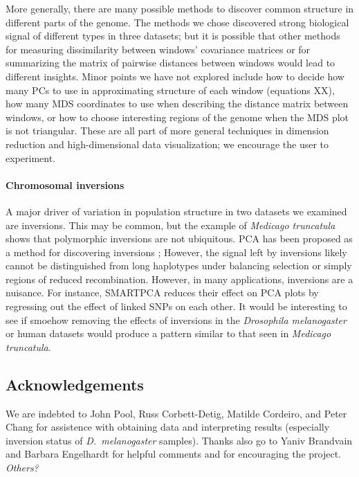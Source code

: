 \documentclass[11pt, oneside]{article}   	%
\newcommand{\plr}[1]{{\em \color{blue} #1}}
\begin{document}
More generally, there are many possible methods to discover common structure in different parts of the genome.
The methods we chose discovered strong biological signal of different types in three datasets;
but it is possible that other methods for measuring dissimilarity between windows' covariance matrices
or for summarizing the matrix of pairwise distances between windows
would lead to different insights.
Minor points we have not explored include how to decide how many PCs to use in approximating structure of each window
(equations XX),
how many MDS coordinates to use when describing the distance matrix between windows,
or how to choose interesting regions of the genome when the MDS plot is not triangular.
These are all part of more general techniques in dimension reduction and high-dimensional data visualization;
we encourage the user to experiment.


\paragraph{Chromosomal inversions}
A major driver of variation in population structure in two datasets we examined are inversions.
This may be common,
but the example of \textit{Medicago truncatula} shows that polymorphic inversions are not ubiquitous.
PCA has been proposed as a method for discovering inversions \citep{ma2012investigation};
However, the signal left by inversions likely cannot be distinguished from long haplotypes under balancing selection 
or simply regions of reduced recombination.
However, in many applications, inversions are a nuisance.
For instance, SMARTPCA \citep{patterson2006population} reduces their effect on PCA plots
by regressing out the effect of linked SNPs on each other.
It would be interesting to see if smoehow removing the effects of inversions in the \textit{Drosophila melanogaster} or human datasets
would produce a pattern similar to that seen in \textit{Medicago truncatula}.

\subsection*{Acknowledgements}

We are indebted to John Pool, Russ Corbett-Detig, Matilde Cordeiro, and Peter Chang 
for assistence with obtaining data and interpreting results
(especially inversion status of \textit{D.~melanogaster} samples).
Thanks also go to Yaniv Brandvain and Barbara Engelhardt for helpful comments 
and for encouraging the project.
\plr{Others?}
\end{document}
